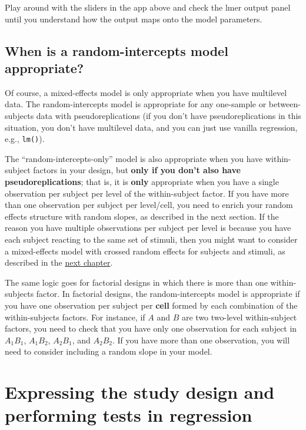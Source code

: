 \documentclass[]{book}
\begin{document}
Play around with the sliders in the app above and check the lmer output panel until you understand how the output maps onto the model parameters.

\hypertarget{when-is-a-random-intercepts-model-appropriate}{%
\subsection{When is a random-intercepts model appropriate?}\label{when-is-a-random-intercepts-model-appropriate}}

Of course, a mixed-effects model is only appropriate when you have multilevel data. The random-intercepts model is appropriate for any one-sample or between-subjects data with pseudoreplications (if you don't have pseudoreplications in this situation, you don't have multilevel data, and you can just use vanilla regression, e.g., \texttt{lm()}).

The ``random-intercepts-only'' model is also appropriate when you have within-subject factors in your design, but \textbf{only if you don't also have pseudoreplications}; that is, it is \textbf{only} appropriate when you have a single observation per subject per level of the within-subject factor. If you have more than one observation per subject per level/cell, you need to enrich your random effects structure with random slopes, as described in the next section. If the reason you have multiple observations per subject per level is because you have each subject reacting to the same set of stimuli, then you might want to consider a mixed-effects model with crossed random effects for subjects and stimuli, as described in the \href{linear-mixed-effects-models-with-crossed-random-factors.html}{next chapter}.

The same logic goes for factorial designs in which there is more than one within-subjects factor. In factorial designs, the random-intercepts model is appropriate if you have one observation per subject per \textbf{cell} formed by each combination of the within-subjects factors. For instance, if \(A\) and \(B\) are two two-level within-subject factors, you need to check that you have only one observation for each subject in \(A_1B_1\), \(A_1B_2\), \(A_2B_1\), and \(A_2B_2\). If you have more than one observation, you will need to consider including a random slope in your model.

\hypertarget{expressing-the-study-design-and-performing-tests-in-regression}{%
\section{Expressing the study design and performing tests in regression}\label{expressing-the-study-design-and-performing-tests-in-regression}}
\end{document}
